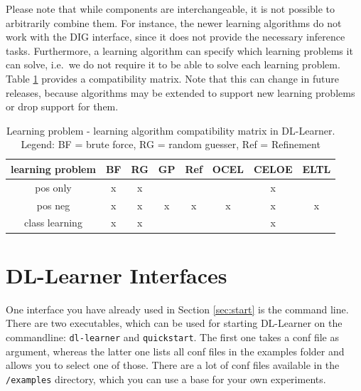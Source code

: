 \documentclass[a4paper,12pt]{scrartcl}
\newcommand{\todo}[1]{\textbf{[ToDo: #1]}}
\begin{document}
Please note that while components are interchangeable, it is not possible to arbitrarily combine them. For instance, the newer learning algorithms do not work with the DIG interface, since it does not provide the necessary inference tasks. Furthermore, a learning algorithm can specify which learning problems it can solve, i.e.~we do not require it to be able to solve each learning problem. Table \ref{tab:la_lp_comp} provides a compatibility matrix. Note that this can change in future releases, because algorithms may be extended to support new learning problems or drop support for them.

\begin{table}[htb]
\centering
\begin{tabular}{c|ccccccc}
learning problem & BF & RG & GP & Ref & OCEL & CELOE & ELTL \\\hline
pos only & x & x & & & & x & \\
pos neg & x & x & x & x & x & x & x  \\
class learning & x & x & & & & x &
\end{tabular}
\caption{Learning problem - learning algorithm compatibility matrix in DL-Learner. Legend: BF = brute force, RG = random guesser, Ref = Refinement}
\label{tab:la_lp_comp}
\end{table}

\section{DL-Learner Interfaces}



One interface you have already used in Section \ref{sec:start} is the command line. There are two executables, which can be used for starting DL-Learner on the commandline: \verb|dl-learner| and \verb|quickstart|. The first one takes a conf file as argument, whereas the latter one lists all conf files in the examples folder and allows you to select one of those. There are a lot of conf files available in the \verb|/examples| directory, which you can use a base for your own experiments.
\end{document}
